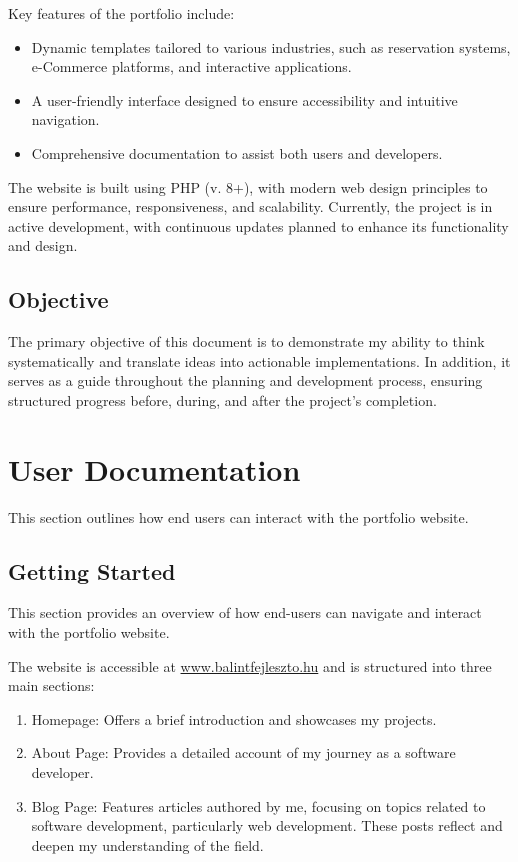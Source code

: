 \documentclass[12pt,a4paper]{report}
\begin{document}
Key features of the portfolio include:

\begin{itemize}
    \item Dynamic templates tailored to various industries, such as reservation systems, e-Commerce platforms, and interactive applications.
    \item A user-friendly interface designed to ensure accessibility and intuitive navigation.
    \item Comprehensive documentation to assist both users and developers.
\end{itemize}

The website is built using PHP (v. 8+), with modern web design principles to ensure performance, responsiveness, and scalability. Currently, the project is in active development, with continuous updates planned to enhance its functionality and design.

\section{Objective}
The primary objective of this document is to demonstrate my ability to think systematically and translate ideas into actionable implementations. In addition, it serves as a guide throughout the planning and development process, ensuring structured progress before, during, and after the project's completion.

\chapter{User Documentation}
This section outlines how end users can interact with the portfolio website.

\section{Getting Started}
This section provides an overview of how end-users can navigate and interact with the portfolio website.

The website is accessible at \url{www.balintfejleszto.hu} and is structured into three main sections:

\begin{enumerate}
    \item Homepage: Offers a brief introduction and showcases my projects.
    \item About Page: Provides a detailed account of my journey as a software developer.
    \item Blog Page: Features articles authored by me, focusing on topics related to software development, particularly web development. These posts reflect and deepen my understanding of the field.
\end{enumerate}
\end{document}
